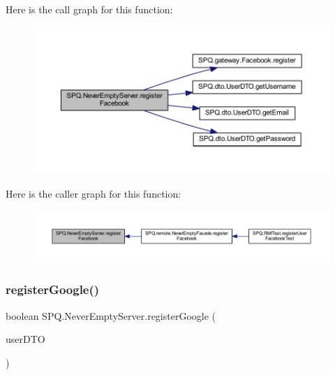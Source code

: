 Here is the call graph for this function\+:\nopagebreak
\begin{figure}[H]
\begin{center}
\leavevmode
\includegraphics[width=350pt]{class_s_p_q_1_1_never_empty_server_abf7e271e0edb91e8f8ed73063de74b03_cgraph}
\end{center}
\end{figure}
Here is the caller graph for this function\+:\nopagebreak
\begin{figure}[H]
\begin{center}
\leavevmode
\includegraphics[width=350pt]{class_s_p_q_1_1_never_empty_server_abf7e271e0edb91e8f8ed73063de74b03_icgraph}
\end{center}
\end{figure}
\mbox{\label{class_s_p_q_1_1_never_empty_server_ac97355451c02fc378cb5d8f33f442ce6}} 
\subsubsection{\texorpdfstring{register\+Google()}{registerGoogle()}}
{\footnotesize\ttfamily boolean S\+P\+Q.\+Never\+Empty\+Server.\+register\+Google (\begin{DoxyParamCaption}\item[{\mbox{\hyperlink{class_s_p_q_1_1dto_1_1_user_d_t_o}{User\+D\+TO}}}]{user\+D\+TO }\end{DoxyParamCaption})}

